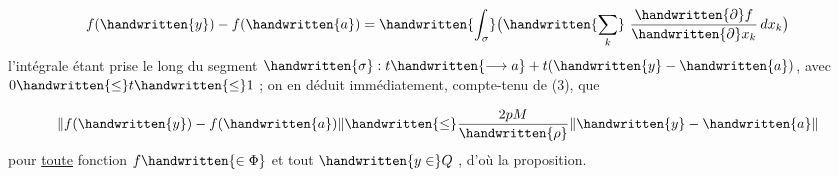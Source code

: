 \[
f(\handwritten{y})-f(\handwritten{a})=\handwritten{\int_{\sigma}}\bigl(\handwritten{\sum_k}\ \frac{\handwritten{\partial} f}{\handwritten{\partial} x_k}\,dx_k\bigr)
\]
l'intégrale étant prise le long du segment $\handwritten{\sigma}:t\handwritten{\longrightarrow a}+t(\handwritten{y}-\handwritten{a})$, avec $0\handwritten{\leq}t\handwritten{\leq}1$ ; on en déduit immédiatement, compte-tenu de (3), que

\[
\lVert f(\handwritten{y})-f(\handwritten{a})\rVert\handwritten{\leq}\frac{2pM}{\handwritten{\rho}}\lVert\handwritten{y}-\handwritten{a}\rVert
\]
pour \uline{toute} fonction $f\handwritten{\in\Phi}$ et tout $\handwritten{y\in}Q$ , d'où la proposition.
